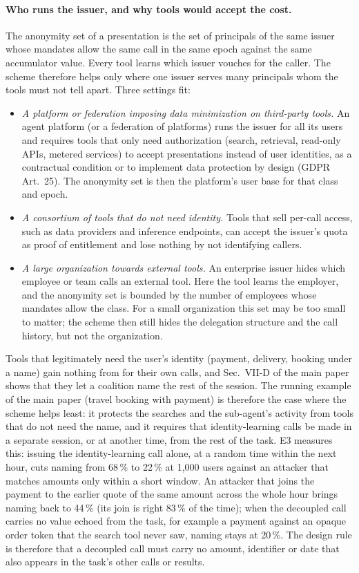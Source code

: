\paragraph{Who runs the issuer, and why tools would accept the cost.} The anonymity set of a presentation is the set of principals of the same issuer whose mandates allow the same call in the same epoch against the same accumulator value. Every tool learns which issuer vouches for the caller. The scheme therefore helps only where one issuer serves many principals whom the tools must not tell apart. Three settings fit:
\begin{itemize}[leftmargin=*]
\item \emph{A platform or federation imposing data minimization on third-party tools.} An agent platform (or a federation of platforms) runs the issuer for all its users and requires tools that only need authorization (search, retrieval, read-only APIs, metered services) to accept presentations instead of user identities, as a contractual condition or to implement data protection by design (GDPR Art.~25). The anonymity set is then the platform's user base for that class and epoch.
\item \emph{A consortium of tools that do not need identity.} Tools that sell per-call access, such as data providers and inference endpoints, can accept the issuer's quota as proof of entitlement and lose nothing by not identifying callers.
\item \emph{A large organization towards external tools.} An enterprise issuer hides which employee or team calls an external tool. Here the tool learns the employer, and the anonymity set is bounded by the number of employees whose mandates allow the class. For a small organization this set may be too small to matter; the scheme then still hides the delegation structure and the call history, but not the organization.
\end{itemize}
Tools that legitimately need the user's identity (payment, delivery, booking under a name) gain nothing from \sys{} for their own calls, and Sec.~VII-D of the main paper shows that they let a coalition name the rest of the session. The running example of the main paper (travel booking with payment) is therefore the case where the scheme helps least: it protects the searches and the sub-agent's activity from tools that do not need the name, and it requires that identity-learning calls be made in a separate session, or at another time, from the rest of the task. E3 measures this: issuing the identity-learning call alone, at a random time within the next hour, cuts naming from 68\,\% to 22\,\% at 1{,}000 users against an attacker that matches amounts only within a short window. An attacker that joins the payment to the earlier quote of the same amount across the whole hour brings naming back to 44\,\% (its join is right 83\,\% of the time); when the decoupled call carries no value echoed from the task, for example a payment against an opaque order token that the search tool never saw, naming stays at 20\,\%. The design rule is therefore that a decoupled call must carry no amount, identifier or date that also appears in the task's other calls or results.

